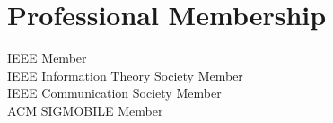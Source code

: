 \documentclass[letterpaper,11pt]{article}
\newcommand{\resumeSubHeadingListStart}{\begin{itemize}[leftmargin=0.0in, label={}]}
\begin{document}
\section{Professional Membership}

IEEE Member
\\
IEEE Information Theory Society Member\\
IEEE Communication Society Member\\
ACM SIGMOBILE Member

\end{document}
